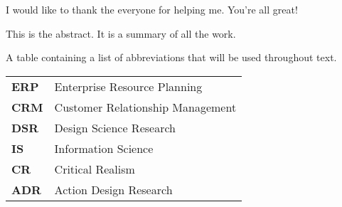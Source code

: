 \documentclass[a4paper,oneside,11pt]{book}
\begin{document}
\CoSupervisor{} 
\AssistantSupervisor{} 

\MakeTitle 

\begin{Acknowledgements}{}
			I would like to thank the everyone for helping me. You're all great!
\end{Acknowledgements}

\begin{Abstract}{}
			This is the abstract. It is a summary of all the work.
\end{Abstract}

\MakeTOCandLOFandLOT %

\begin{TableOfAbbrev}
			A table containing a list of abbreviations that will be used throughout text.
			\begin{table}[!htpb!]%
			\begin{tabular}{ll}
			\textbf{ERP} & Enterprise Resource Planning\\
                \textbf{CRM} & Customer Relationship Management\\
                \textbf{DSR} & Design Science Research\\
                \textbf{IS} & Information Science\\
                \textbf{CR} & Critical Realism\\
                \textbf{ADR} & Action Design Research\\
			\end{tabular}
			\end{table}
\end{TableOfAbbrev}
\end{document}
